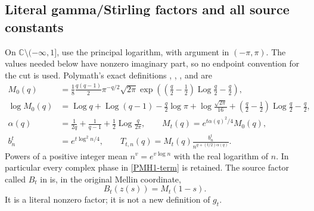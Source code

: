 \documentclass[11pt]{article}
\newcommand{\C}{\mathbb C}
\newcommand{\Log}{\operatorname{Log}}
\newcommand{\Src}[1]{\cite[original TeX label \texttt{#1}]{polymath}}
\begin{document}
\subsection{Literal gamma/Stirling factors and all source constants}

On $\C\setminus(-\infty,1]$, use the principal logarithm, with argument
in $(-\pi,\pi)$. The values needed below have nonzero imaginary part,
so no endpoint convention for the cut is used. Polymath's exact
definitions \Src{M-def}, \Src{logM}, \Src{alpha-form}, and \Src{Mt-def}
are
\begin{align}
 M_0(q)&=\frac18\frac{q(q-1)}2\pi^{-q/2}\sqrt{2\pi}
 \exp\left((\tfrac q2-\tfrac12)\Log\tfrac q2-\tfrac q2\right),
 \label{PMH1-M0}\\
 \log M_0(q)&=\Log q+\Log(q-1)-\tfrac q2\log\pi
 +\log\tfrac{\sqrt{2\pi}}{16}
 +(\tfrac q2-\tfrac12)\Log\tfrac q2-\tfrac q2,
 \label{PMH1-logM}\\
 \alpha(q)&=\frac1{2q}+\frac1{q-1}+\frac12\Log\frac q{2\pi},
 \qquad M_t(q)=e^{t\alpha(q)^2/4}M_0(q),
 \label{PMH1-alpha}\\
 b_n^t&=e^{t\log^2n/4},\qquad
 T_{t,n}(q)=M_t(q)\frac{b_n^t}{n^{q+(t/2)\alpha(q)}}.
 \label{PMH1-term}
\end{align}
Powers of a positive integer mean $n^v=e^{v\log n}$ with the real
logarithm of $n$. In particular every complex phase in
\eqref{PMH1-term} is retained. The source factor called $B_t$ in
\Src{bo-def} is, in the original Mellin coordinate,
\begin{equation}\label{PMH1-B}
 B_t(z(s))=M_t(1-s).
\end{equation}
It is a literal nonzero factor; it is not a new definition of $g_t$.
\end{document}
